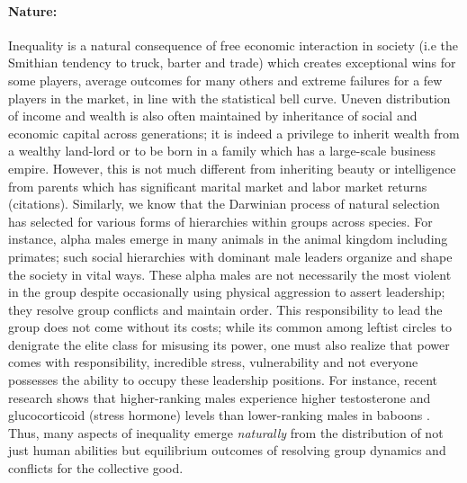 \documentclass[12pt]{article}
\newcommand{\1}{\mathbbm 1}
\begin{document}
		\paragraph{Nature:} Inequality is a natural consequence of free economic interaction in society (i.e the Smithian tendency to truck, barter and trade) which creates exceptional wins for some players, average outcomes for many others and extreme failures for a few players in the market, in line with the statistical bell curve. Uneven distribution of income and wealth is also often maintained by inheritance of social and economic capital across generations; it is indeed a privilege to inherit wealth from a wealthy land-lord or to be born in a family which has a large-scale business empire. However, this is not much different from inheriting beauty or intelligence from parents which has significant marital market and labor market returns (citations). Similarly, we know that the Darwinian process of natural selection has selected for various forms of hierarchies within groups across species. For instance, alpha males emerge in many animals in the animal kingdom including primates; such social hierarchies with dominant male leaders organize and shape the society in vital ways. These alpha males are not necessarily the most violent in the group despite occasionally using physical aggression to assert leadership; they resolve group conflicts and maintain order. This responsibility to lead the group does not come without its costs; while its common among leftist circles to denigrate the elite class for misusing its power, one must also realize that power comes with responsibility, incredible stress, vulnerability and not everyone possesses the ability to occupy these leadership positions. For instance, recent research shows that higher-ranking males experience higher testosterone and glucocorticoid (stress hormone) levels than lower-ranking males in  baboons \cite{gesquiere2011life}. Thus, many aspects of inequality emerge \textit{naturally} from the distribution of not just human abilities but  equilibrium outcomes of resolving group dynamics and conflicts for the collective good.
		
		
		
\end{document}
